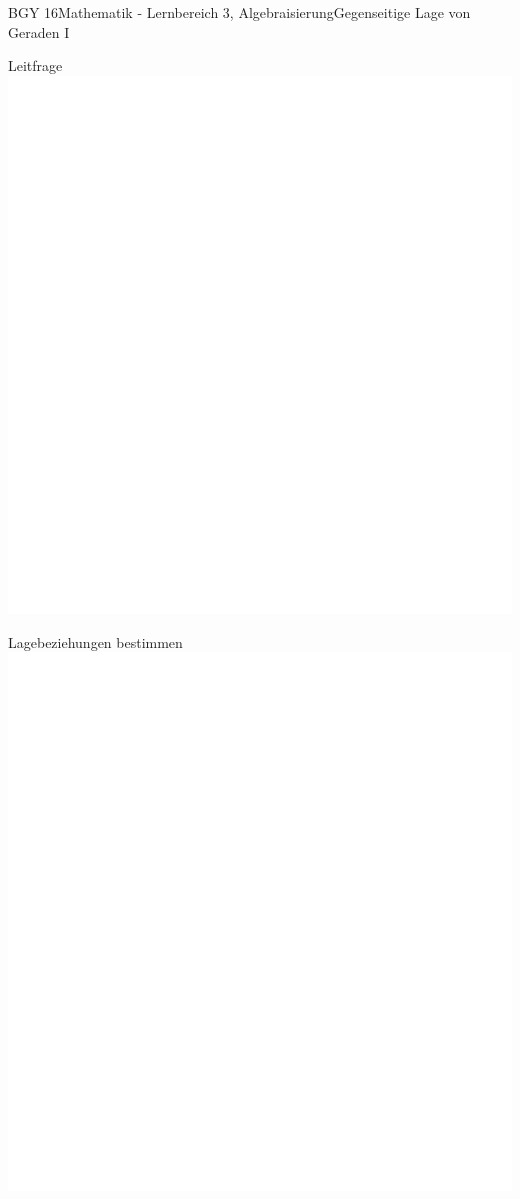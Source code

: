 \documentclass[oneside,openany,headings=optiontotoc,11pt,numbers=noenddot]{scrreprt}
\begin{document}
\begin{worksheet}{BGY 16}{Mathematik - Lernbereich 3, Algebraisierung}{Gegenseitige Lage von Geraden I}
\begin{framed}
		\end{framed}
		\begin{framed}
			\noindent
			\tiny{\color{codegray}Leitfrage}\\
			\includegraphics[scale=0.05]{../empty.jpg}
		\end{framed}
		\begin{framed}
			\noindent
			\tiny{\color{codegray}Lagebeziehungen bestimmen}\\
			\includegraphics[scale=0.65]{../empty.jpg}\\

\end{framed}
\end{worksheet}
\end{document}
